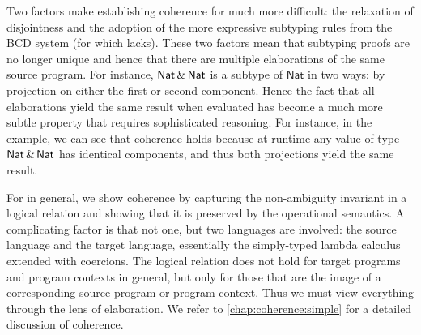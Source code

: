 Two factors make establishing coherence for \namee much more difficult: the
relaxation of disjointness and the adoption of the more expressive subtyping
rules from the BCD system (for which \oname lacks). These two factors mean that subtyping proofs are no
longer unique and hence that there are multiple elaborations of the same source
program. For instance, $\mathsf{Nat} \,\&\, \mathsf{Nat}$ is a subtype of $\mathsf{Nat}$ in two
ways: by projection on either the first or second component.
Hence the fact that all elaborations yield the same result when evaluated has
become a much more subtle property that requires sophisticated reasoning.
For instance, in the example, we can see that coherence holds because  at
runtime any value of type $\mathsf{Nat} \,\&\, \mathsf{Nat}$ has identical components, and
thus both projections yield the same result.

For \namee in general, we show coherence by capturing the non-ambiguity
invariant in a logical relation and showing that it is preserved by the
operational semantics. A complicating factor is that not one, but two languages
are involved: the source language \namee and the target language, essentially
the simply-typed lambda calculus extended with coercions. The
logical relation does not hold for target programs and program contexts in
general, but only for those that are the image of a corresponding source
program or program context. Thus we must view everything through the lens of
elaboration. We refer to \cref{chap:coherence:simple} for a detailed discussion of coherence.

